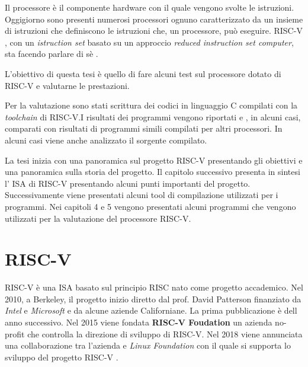 \documentclass[12pt,a4paper]{report}
\begin{document}
Il processore è il componente hardware con il quale vengono svolte le istruzioni.
Oggigiorno sono presenti numerosi processori ognuno caratterizzato da un insieme di istruzioni che definiscono le istruzioni che, un processore,  può eseguire. RISC-V , con un \textit{istruction set} basato su un approccio \textit{reduced instruction set computer}\cite{RISCOverview}, sta facendo parlare di sè
\cite{RISCVHistory}.

L'obiettivo di questa tesi è quello di fare alcuni test sul processore dotato di RISC-V e valutarne le prestazioni.

Per la valutazione sono stati scrittura dei codici in linguaggio C compilati con la \textit{toolchain} di RISC-V.I risultati dei programmi vengono riportati e , in alcuni casi, comparati con risultati di programmi simili compilati per altri processori.
In alcuni casi viene anche analizzato il sorgente compilato.

La tesi inizia con una panoramica sul progetto RISC-V presentando gli obiettivi e una panoramica  sulla storia del progetto. Il capitolo successivo presenta in sintesi l' ISA di RISC-V presentando alcuni punti importanti del progetto. Successivamente viene presentati alcuni tool di compilazione utilizzati per i programmi. Nei capitoli 4 e 5 vengono presentati alcuni programmi che vengono utilizzati per la valutazione del processore RISC-V.


\tableofcontents
\listoffigures
\listoftables
\lstlistoflistings

\chapter{RISC-V}

RISC-V è una ISA basato sul principio RISC nato come progetto accademico.  Nel 2010, a Berkeley, il progetto inizio diretto dal prof. David Patterson finanziato da \textit{Intel} e \textit{Microsoft} e da alcune aziende Californiane. La prima pubblicazione è dell anno successivo. Nel 2015 viene fondata  \textbf{RISC-V Foudation} un azienda no-profit che controlla la direzione di sviluppo di RISC-V. Nel 2018 viene annunciata una collaborazione tra l'azienda e \textit{Linux Foundation} con il quale si supporta lo sviluppo del progetto RISC-V \cite{RISCOrgHistory}.
\end{document}
